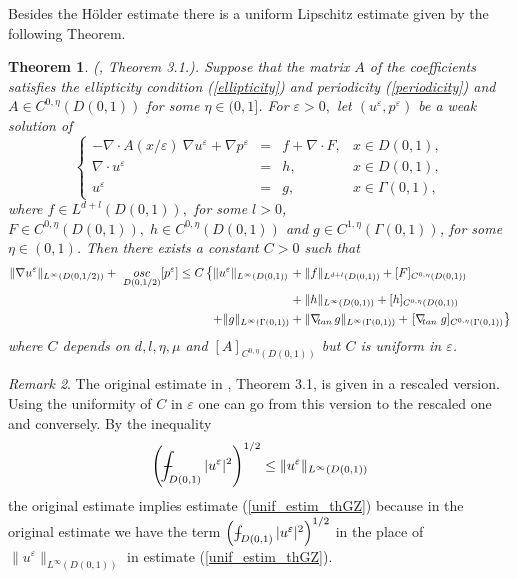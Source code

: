 \documentclass[11pt, reqno]{amsart}
\newtheorem{theorem}{Theorem}[section]
\theoremstyle{definition}
\theoremstyle{remark}
\newtheorem{remark}[theorem]{Remark}
\numberwithin{equation}{section}
\def\Xint#1{\mathchoice
	{\XXint\displaystyle\textstyle{#1}}%
	{\XXint\textstyle\scriptstyle{#1}}%
	{\XXint\scriptstyle\scriptscriptstyle{#1}}%
	{\XXint\scriptscriptstyle\scriptscriptstyle{#1}}%
	\!\int}
\def\XXint#1#2#3{{\setbox0=\hbox{$#1{#2#3}{\int}$ }
		\vcenter{\hbox{$#2#3$ }}\kern-.6\wd0}}
\def\dashint{\Xint-}        %
\begin{document}
	\noindent Besides the H\"older estimate there is a uniform Lipschitz estimate given by the following Theorem.
	\begin{theorem}\label{unif_estim} \textup{  (\cite{GZ}, Theorem 3.1.)}.
		Suppose that the matrix $A$ of the coefficients satisfies the ellipticity condition \textup{(\ref{ellipticity})} and periodicity \textup{(\ref{periodicity})} and $A\in C^{0,\eta}(D(0,1))$  for some $\eta\in(0,1]$. For $\varepsilon>0,$ let $(u^\varepsilon,  p^\varepsilon)$ be a weak solution of 
		\begin{equation}\label{Stokes_system_D1}
			\left\{
			\begin{array}{rcll}
				-\nabla\cdot A (x/\varepsilon) \: \nabla u^\varepsilon +  \nabla p^\varepsilon&=& f+ \nabla\cdot F, & x\in D(0,1),\\
				\nabla\cdot u^\varepsilon &=& h,&   x\in D(0,1),\\
				u^\varepsilon &=& g , & 
				x\in  \Gamma(0,1),
			\end{array}
			\right. 
		\end{equation}
		where $f\in L^{d+l}(D(0,1)), $ for some $l>0$, $F\in C^{0,\eta}(D(0,1)), \; h\in C^{0,\eta}(D(0,1))$ and $ g\in C^{1,\eta}(\Gamma(0,1) )$, for some $\eta \in (0,1)$. Then there exists a constant $C>0$ such that 
		\begin{align}\label{unif_estim_thGZ}
			\|\nabla u^\varepsilon \|_{L^\infty(D(0,1/2))} + \
			\underset{D(0,1/2)}{\textup{osc}} [p^\varepsilon ]\leq   C \left\{ \| u^\varepsilon \|_{L^\infty(D(0,1))} \right. &+ \| f \|_{L^{d+l}(D(0,1))} +  [F]_{C^{0,\eta}(D(0,1))}\\
			&+     \| h \|_{L^\infty(D(0,1))} +  [h]_{C^{0,\eta}(D(0,1))}  \nonumber\\
			+\| g \|_{L^\infty(\Gamma(0,1))} &+ \| \nabla_{\!\!\textup{ tan}} \, g \|_{L^\infty(\Gamma(0,1))} + \left.  [\nabla_{\!\!\textup{ tan}}\; g]_{C^{0,\eta}(\Gamma(0,1))} \right\} \nonumber
		\end{align}
		where $C$ depends on $d, l, \eta, \mu$ and $[A]_{C^{0,\eta}(D(0,1))}$  but $C$ is uniform in $\varepsilon $.
	\end{theorem}
	\noindent \begin{remark}
	The original estimate in \textup{\cite{GZ}, Theorem 3.1,} is given in a rescaled version. Using the uniformity of $C$ in $\varepsilon$ one can  go from this version to the rescaled one and conversely.	
		By the inequality
	\begin{align} \left(  \dashint_{D(0,1)} | u^\varepsilon |^2 \right)^{1/2} \leq   \| u^\varepsilon \|_{L^\infty(D(0,1))}  \nonumber
	\end{align}
	 the original estimate implies estimate (\ref{unif_estim_thGZ}) because in the original estimate we have the term $\left(  \dashint_{D(0,1)} | u^\varepsilon |^2 \right)^{1/2}$ in the place of $ \| u^\varepsilon \|_{L^\infty(D(0,1))}  $ in estimate (\ref{unif_estim_thGZ}).\\
		\end{remark} 
	
\end{document}

